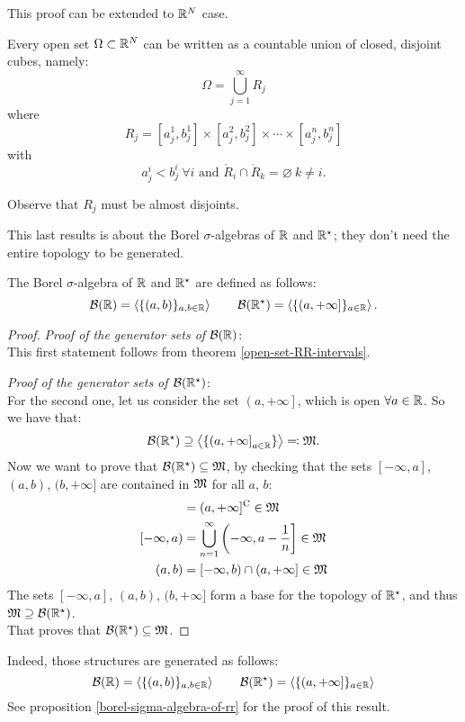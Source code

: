 This proof can be extended to $\mathbb R^N$ case.

\begin{prop}
	Every open set $\Omega \subset \mathbb R^N$ can be written as a countable union of closed, disjoint cubes, namely:
	$$ \Omega = \bigcup_{j = 1}^{\infty} R_j$$
	where
	$$R_j = [a_j^1,b_j^1]\times[a_j^2,b_j^2]\times\cdots\times[a_j^n,b_j^n]$$
	with
	$$a_j^i < b_j ^i \ \forall i \text{ and } \mathring R_i \cap \mathring R_k = \varnothing \ k \neq i.$$ 
\end{prop}
Observe that $R_j$ must be almost disjoints.


This last results is about the Borel $\sigma$-algebras of $\mathbb R$ and $\mathbb R^\star$; they don't need the entire topology to be generated. 
\begin{theo}\label{borel-sigma-algebra-of-rr}
	The Borel $\sigma$-algebra of $\mathbb R$ and $\mathbb R^\star$ are defined as follows:
	$$\mathcal B(\mathbb R)=\left\langle\{\left(a,b\right)\}_{a,b \in \mathbb R}\right\rangle \qquad \mathcal B(\mathbb R^\star )=\left\langle\{\left(a,+\infty\right]\}_{a\in\mathbb R}\right\rangle.$$
\end{theo}
\begin{proof}
	\textit{Proof of the generator sets of $\mathcal B(\mathbb R)$}:\\
	This first statement follows from theorem \vref{open-set-RR-intervals}.
	
	\textit{Proof of the generator sets of $\mathcal B(\mathbb R^\star)$}:\\
	For the second one, let us consider the set $\left(a, +\infty\right]$, which is open $\forall a \in \mathbb R$. So we have that:
	$$\mathcal B(\mathbb R^\star) \supseteq \left\langle\{\left(a,+\infty\right]_{a \in \mathbb R}\}\right\rangle \eqqcolon \mathfrak M.$$
	Now we want to prove that $\mathcal B(\mathbb R^\star) \subseteq \mathfrak M$, by checking that the sets $[-\infty, a]$, $(a, b)$, $(b, +\infty]$ are contained in $\mathfrak M$ for all $a$, $b$:
	\begin{align*}
	[-\infty, a] &= (a, +\infty]\comp \in \mm \\
	\left[-\infty,a\right) &= \bigcup_{n=1}^\infty \left(-\infty, a - \frac 1 n \right] \in \mm \\
	(a,b) &= \left[-\infty,b\right) \cap \left(a,+\infty\right] \in \mm
	\end{align*}
	The sets $[-\infty, a]$, $(a, b)$, $(b, +\infty]$ form a base for the topology of $\mathbb R^\star$, and thus $\mathfrak M \supseteq \mathcal B(\mathbb R^\star)$.\\
	That proves that $\mathcal B(\mathbb R^\star) \subseteq \mathfrak M$.
\end{proof}


Indeed, those structures are generated as follows: 
	$$\mathcal B(\mathbb R)=\left\langle\{\left(a,b\right)\}_{a,b \in \mathbb R}\right\rangle \qquad \mathcal B(\mathbb R^\star )=\left\langle\{\left(a,+\infty\right]\}_{a\in\mathbb R}\right\rangle$$
See proposition \vref{borel-sigma-algebra-of-rr} for the proof of this result.


